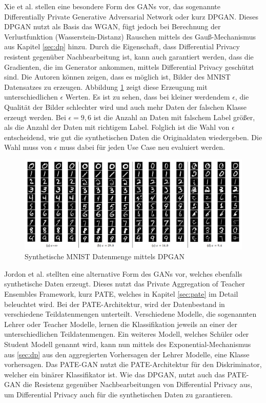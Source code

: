 Xie et al. \cite{P-70} stellen eine besondere Form des GANs vor, das sogenannte Differentially Private Generative Adversarial Network oder kurz DPGAN.
Dieses DPGAN nutzt als Basis das WGAN, fügt jedoch bei Berechnung der Verlustfunktion (Wasserstein-Distanz) Rauschen mittels des Gauß-Mechanismus aus Kapitel \ref{sec:dp} hinzu.
Durch die Eigenschaft, dass Differential Privacy resistent gegenüber Nachbearbeitung ist, kann auch garantiert werden, dass die Gradienten, die im Generator ankommen, mittels Differential Privacy geschützt sind.
Die Autoren können zeigen, dass es möglich ist, Bilder des MNIST Datensatzes \cite{D-MNIST} zu erzeugen.
Abbildung \ref{fig:dpgan} zeigt diese Erzeugung mit unterschiedlichen $\epsilon$ Werten.
Es ist zu sehen, dass bei kleiner werdendem $\epsilon$, die Qualität der Bilder schlechter wird und auch mehr Daten der falschen Klasse erzeugt werden. 
Bei $\epsilon=9,6$ ist die Anzahl an Daten mit falschem Label größer, als die Anzahl der Daten mit richtigem Label.
Folglich ist die Wahl von $\epsilon$ entscheidend, wie gut die synthetischen Daten die Originaldaten wiedergeben.
Die Wahl muss von $\epsilon$ muss dabei für jeden Use Case neu evaluiert werden.

\begin{figure}[!htb]
    \centering
    \includegraphics[width=15cm]{figures/dpgan}
    \caption{Synthetische MNIST Datenmenge mittels DPGAN \cite{P-70}}
    \label{fig:dpgan}
\end{figure} 

Jordon et al. \cite{P-68} stellten eine alternative Form des GANs vor, welches ebenfalls synthetische Daten erzeugt. 
Dieses nutzt das Private Aggregation of Teacher Ensembles Framework, kurz PATE, welches in Kapitel \ref{sec:pate} im Detail beleuchtet wird.
Bei der PATE-Architektur, wird der Datenbestand in verschiedene Teildatenmengen unterteilt. 
Verschiedene Modelle, die sogenannten Lehrer oder Teacher Modelle, lernen die Klassifikation jeweils an einer der unterschiedlichen Teildatenmengen.
Ein weiteres Modell, welches Schüler oder Student Modell genannt wird, kann nun mittels des Exponential-Mechanismus aus \ref{sec:dp} aus den aggregierten Vorhersagen der Lehrer Modelle, eine Klasse vorhersagen.
Das PATE-GAN nutzt die PATE-Architektur für den Diskriminator, welcher ein binärer Klassifikator ist.
Wie das DPGAN, nutzt auch das PATE-GAN die Resistenz gegenüber Nachbearbeitungen von Differential Privacy aus, um Differential Privacy auch für die synthetischen Daten zu garantieren.


